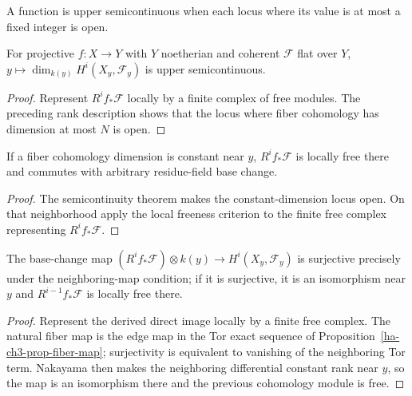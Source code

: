 \begin{definition}\label{ha-ch3-def-upper-semicontinuity}
A function is upper semicontinuous when each locus where its value is at most a
fixed integer is open.
\end{definition}
\begin{theorem}[Semicontinuity]\label{ha-ch3-thm-semicontinuity}
For projective $f:X\to Y$ with $Y$ noetherian and coherent $\mathcal F$ flat
over $Y$, $y\mapsto\dim_{k(y)}H^i(X_y,\mathcal F_y)$ is upper semicontinuous.

\end{theorem}
\begin{proof}
Represent $R^if_*\mathcal F$ locally by a finite complex of free
modules.  The preceding rank description shows that the locus where fiber
cohomology has dimension at most $N$ is open.
\end{proof}
\begin{corollary}\label{ha-ch3-cor-grauert}
If a fiber cohomology dimension is constant near $y$, $R^if_*\mathcal F$ is
locally free there and commutes with arbitrary residue-field base change.

\end{corollary}
\begin{proof}

The semicontinuity theorem makes the constant-dimension locus open.  On that neighborhood apply the
local freeness criterion to the finite free complex representing $R^if_*\mathcal F$.

\end{proof}
\begin{proposition}\label{ha-ch3-prop-cohomology-base-change}
The base-change map $(R^if_*\mathcal F)\otimes k(y)\to H^i(X_y,\mathcal F_y)$
is surjective precisely under the neighboring-map condition; if it is
surjective, it is an isomorphism near $y$ and $R^{i-1}f_*\mathcal F$ is locally
free there.
\end{proposition}
\begin{proof}

Represent the derived direct image locally by a finite free complex.  The natural fiber map is the
edge map in the Tor exact sequence of Proposition~\ref{ha-ch3-prop-fiber-map}; surjectivity is
equivalent to vanishing of the neighboring Tor term.  Nakayama then makes the neighboring differential
constant rank near $y$, so the map is an isomorphism there and the previous cohomology module is free.

\end{proof}
